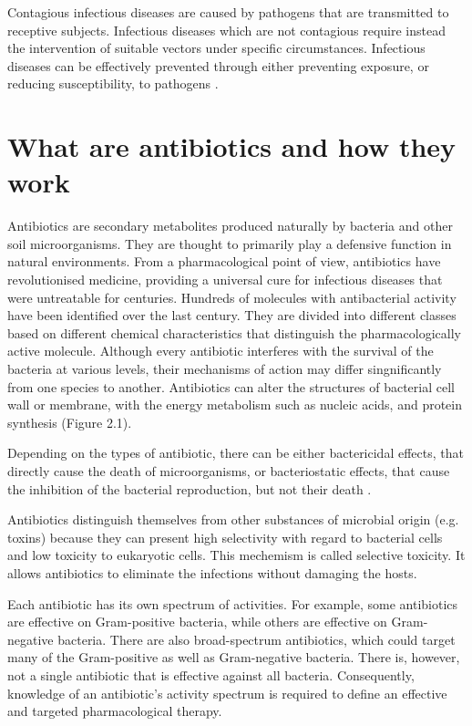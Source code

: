 \documentclass[11pt]{report}
\begin{document}
Contagious infectious diseases are caused by pathogens that are transmitted to receptive subjects.
Infectious diseases which are not contagious require instead the intervention of suitable vectors under specific circumstances.
Infectious diseases can be effectively prevented through either preventing exposure, or reducing susceptibility, to pathogens \cite{EPICentro}.

\chapter{What are antibiotics and how they work}
Antibiotics are secondary metabolites produced naturally by bacteria and other soil microorganisms.
They are thought to primarily play a defensive function in natural environments.
From a pharmacological point of view, antibiotics have revolutionised medicine, providing a universal cure for infectious diseases that were untreatable for centuries.
Hundreds of molecules with antibacterial activity have been identified over the last century. They are divided into different classes based on different chemical characteristics that distinguish the pharmacologically active molecule.
Although every antibiotic interferes with the survival of the bacteria at various levels, their mechanisms of action may differ singnificantly from one species to another.
Antibiotics can alter the structures of bacterial cell wall or membrane, with the energy metabolism such as nucleic acids, and protein synthesis (Figure 2.1).

Depending on the types of antibiotic, there can be either bactericidal effects, that directly cause the death of microorganisms, or bacteriostatic effects, that cause the inhibition of the bacterial reproduction, but not their death \cite{Leekha2011}.

Antibiotics distinguish themselves from other substances of microbial origin (e.g. toxins) because they can present high selectivity with regard to bacterial cells and low toxicity to eukaryotic cells. This mechemism is called selective toxicity. It allows antibiotics to eliminate the infections without damaging the hosts.

Each antibiotic has its own spectrum of activities. For example, some antibiotics are effective on Gram-positive bacteria, while others are effective on Gram-negative bacteria.
There are also broad-spectrum antibiotics, which could target many of the Gram-positive as well as Gram-negative bacteria.
There is, however, not a single antibiotic that is effective against all bacteria.
Consequently, knowledge of an antibiotic’s activity spectrum is required to define an effective and targeted pharmacological therapy.
\end{document}

